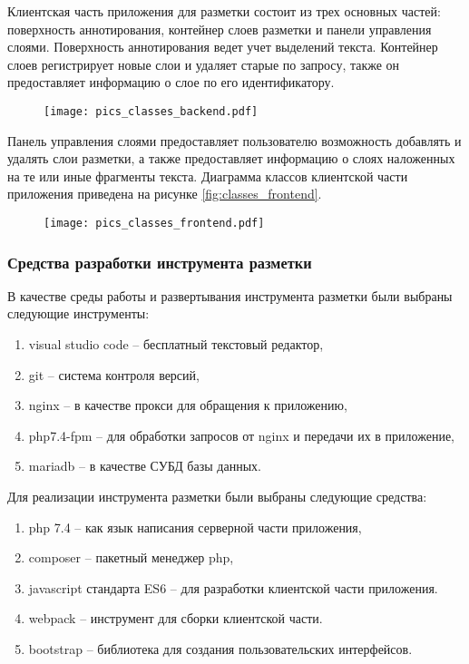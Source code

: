 \documentclass[../main]{subfiles}
\begin{document}
Клиентская часть приложения для разметки состоит из трех основных частей: поверхность аннотирования, контейнер слоев разметки и панели управления слоями. Поверхность аннотирования ведет учет выделений текста. Контейнер слоев регистрирует новые слои и удаляет старые по запросу, также он предоставляет информацию о слое по его идентификатору.

\begin{figure}[H]
    \centering
    {\texttt{[image: pics\_classes\_backend.pdf]}}
    \vspace{-\baselineskip}
\end{figure}

 Панель управления слоями предоставляет пользователю возможность добавлять и удалять слои разметки, а также предоставляет информацию о слоях наложенных на те или иные фрагменты текста. Диаграмма классов клиентской части приложения приведена на рисунке \ref{fig:classes_frontend}.

\begin{figure}[H]
    \centering
    {\texttt{[image: pics\_classes\_frontend.pdf]}}
    \vspace{-\baselineskip}
\end{figure}

\subsubsection{Средства разработки инструмента разметки}
В качестве среды работы и развертывания инструмента разметки были выбраны следующие инструменты:
\begin{enumerate}
    \item visual studio code -- бесплатный текстовый редактор,
    \item git -- система контроля версий,
    \item nginx -- в качестве прокси для обращения к приложению,
    \item php7.4-fpm -- для обработки запросов от nginx и передачи их в приложение,
    \item mariadb -- в качестве СУБД базы данных.
\end{enumerate}

Для реализации инструмента разметки были выбраны следующие средства:
\begin{enumerate}
    \item php 7.4 -- как язык написания серверной части приложения,
    \item composer -- пакетный менеджер php,
    \item javascript стандарта ES6 -- для разработки клиентской части приложения.
    \item webpack -- инструмент для сборки клиентской части.
    \item bootstrap -- библиотека для создания пользовательских интерфейсов.
\end{enumerate}
\end{document}
